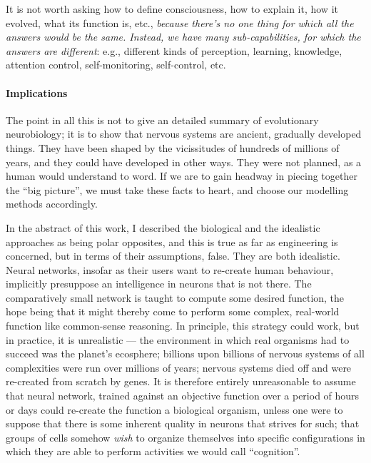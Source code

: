 \begin{emquote}
It is not worth asking how to define consciousness, how to explain it, how it evolved, what its function is, etc., {\em because there's no one thing for which all the answers would be the same. Instead, we have many sub-capabilities, for which the answers are different}: e.g., different kinds of perception, learning, knowledge, attention control, self-monitoring, self-control, etc.
\end{emquote}

\paragraph{Implications} The point in all this is not to give an detailed summary of evolutionary neurobiology; it is to show that nervous systems are ancient, gradually developed things. They have been shaped by the vicissitudes of hundreds of millions of years, and they could have developed in other ways. They were not planned, as a human would understand to word. If we are to gain headway in piecing together the ``big picture'', we must take these facts to heart, and choose our modelling methods accordingly.

In the abstract of this work, I described the biological and the idealistic approaches as being polar opposites, and this is true as far as engineering is concerned, but in terms of their assumptions, false. They are both idealistic. Neural networks, insofar as their users want to re-create human behaviour, implicitly presuppose an intelligence in neurons that is not there. The comparatively small network is taught to compute some desired function, the hope being that it might thereby come to perform some complex, real-world function like common-sense reasoning. In principle, this strategy could work, but in practice, it is unrealistic --- the environment in which real organisms had to succeed was the planet's ecosphere; billions upon billions of nervous systems of all complexities were run over millions of years; nervous systems died off and were re-created from scratch by genes. It is therefore entirely unreasonable to assume that neural network, trained against an objective function over a period of hours or days could re-create the function a biological organism, unless one were to suppose that there is some inherent quality in neurons that strives for such; that groups of cells somehow {\em wish} to organize themselves into specific configurations in which they are able to perform activities we would call ``cognition''. 

